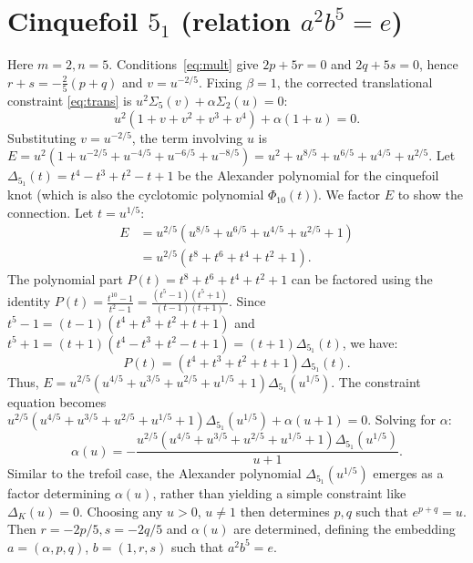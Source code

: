 \documentclass{article}
\begin{document}
\section{Cinquefoil $5_1$ (relation $a^{2}b^{5}=e$)}
Here $m=2, n=5$. Conditions~\eqref{eq:mult} give $2p+5r=0$ and $2q+5s=0$, hence $r+s = -\frac{2}{5}(p+q)$ and $v=u^{-2/5}$.
Fixing $\beta=1$, the corrected translational constraint \eqref{eq:trans} is $u^2 \Sigma_5(v) + \alpha \Sigma_2(u) = 0$:
\begin{equation}
u^2(1+v+v^2+v^3+v^4) + \alpha(1+u) = 0.
\end{equation}
Substituting $v=u^{-2/5}$, the term involving $u$ is $E = u^2(1+u^{-2/5}+u^{-4/5}+u^{-6/5}+u^{-8/5}) = u^{2}+u^{8/5}+u^{6/5}+u^{4/5}+u^{2/5}$.
Let $\Delta_{5_1}(t) = t^4 - t^3 + t^2 - t + 1$ be the Alexander polynomial for the cinquefoil knot (which is also the cyclotomic polynomial $\Phi_{10}(t)$). We factor $E$ to show the connection. Let $t=u^{1/5}$:
\begin{align}
E &= u^{2/5}(u^{8/5} + u^{6/5} + u^{4/5} + u^{2/5} + 1) \\
&= u^{2/5} (t^8 + t^6 + t^4 + t^2 + 1).
\end{align}
The polynomial part $P(t) = t^8 + t^6 + t^4 + t^2 + 1$ can be factored using the identity $P(t) = \frac{t^{10}-1}{t^2-1} = \frac{(t^5-1)(t^5+1)}{(t-1)(t+1)}$. Since $t^5-1 = (t-1)(t^4+t^3+t^2+t+1)$ and $t^5+1 = (t+1)(t^4-t^3+t^2-t+1) = (t+1)\Delta_{5_1}(t)$, we have:
\begin{equation}
P(t) = (t^4+t^3+t^2+t+1) \Delta_{5_1}(t).
\end{equation}
Thus, $E = u^{2/5} (u^{4/5}+u^{3/5}+u^{2/5}+u^{1/5}+1) \Delta_{5_1}(u^{1/5})$.
The constraint equation becomes $u^{2/5} (u^{4/5}+u^{3/5}+u^{2/5}+u^{1/5}+1) \Delta_{5_1}(u^{1/5}) + \alpha(u+1) = 0$.
Solving for $\alpha$:
\begin{equation}
\alpha(u) = - \frac{u^{2/5} (u^{4/5}+u^{3/5}+u^{2/5}+u^{1/5}+1) \Delta_{5_1}(u^{1/5})}{u+1}.
\end{equation}
Similar to the trefoil case, the Alexander polynomial $\Delta_{5_1}(u^{1/5})$ emerges as a factor determining $\alpha(u)$, rather than yielding a simple constraint like $\Delta_K(u)=0$. Choosing any $u>0$, $u\neq1$ then determines $p,q$ such that $e^{p+q}=u$. Then $r=-2p/5, s=-2q/5$ and $\alpha(u)$ are determined, defining the embedding $a=(\alpha,p,q)$, $b=(1,r,s)$ such that $a^2 b^5 = e$.
\end{document}
